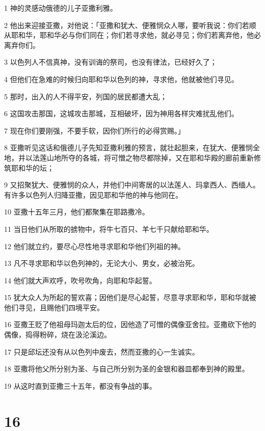 \par 1 神的灵感动俄德的儿子亚撒利雅。
\par 2 他出来迎接亚撒，对他说：「亚撒和犹大、便雅悯众人哪，要听我说：你们若顺从耶和华，耶和华必与你们同在；你们若寻求他，就必寻见；你们若离弃他，他必离弃你们。
\par 3 以色列人不信真神，没有训诲的祭司，也没有律法，已经好久了；
\par 4 但他们在急难的时候归向耶和华以色列的神，寻求他，他就被他们寻见。
\par 5 那时，出入的人不得平安，列国的居民都遭大乱；
\par 6 这国攻击那国，这城攻击那城，互相破坏，因为神用各样灾难扰乱他们。
\par 7 现在你们要刚强，不要手软，因你们所行的必得赏赐。」
\par 8 亚撒听见这话和俄德儿子先知亚撒利雅的预言，就壮起胆来，在犹大、便雅悯全地，并以法莲山地所夺的各城，将可憎之物尽都除掉，又在耶和华殿的廊前重新修筑耶和华的坛；
\par 9 又招聚犹大、便雅悯的众人，并他们中间寄居的以法莲人、玛拿西人、西缅人。有许多以色列人归降亚撒，因见耶和华他的神与他同在。
\par 10 亚撒十五年三月，他们都聚集在耶路撒冷。
\par 11 当日他们从所取的掳物中，将牛七百只、羊七千只献给耶和华。
\par 12 他们就立约，要尽心尽性地寻求耶和华他们列祖的神。
\par 13 凡不寻求耶和华以色列神的，无论大小、男女，必被治死。
\par 14 他们就大声欢呼，吹号吹角，向耶和华起誓。
\par 15 犹大众人为所起的誓欢喜；因他们是尽心起誓，尽意寻求耶和华，耶和华就被他们寻见，且赐他们四境平安。
\par 16 亚撒王贬了他祖母玛迦太后的位，因他造了可憎的偶像亚舍拉。亚撒砍下他的偶像，捣得粉碎，烧在汲沦溪边。
\par 17 只是邱坛还没有从以色列中废去，然而亚撒的心一生诚实。
\par 18 亚撒将他父所分别为圣、与自己所分别为圣的金银和器皿都奉到神的殿里。
\par 19 从这时直到亚撒三十五年，都没有争战的事。

\chapter{16}


